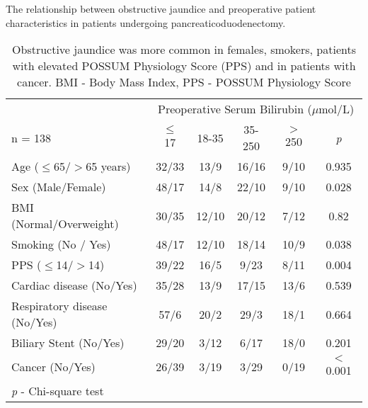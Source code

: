 \begin{table}[p]
\caption{The relationship  between obstructive jaundice and preoperative patient characteristics in patients undergoing pancreaticoduodenectomy.}
\label{table:cpet_oj_patient}
\centering\renewcommand{\arraystretch}{1.4} %
\setlength{\tabcolsep}{10pt} %
	\begin{tabular}{| l | c c c c c |}
		\hline
		                             & \multicolumn{5}{c|}{Preoperative Serum Bilirubin ($\mu$mol/L)} \\
		n = 138                      & $\leq$ 17 & 18-35 & 35-250 & $>$ 250 & \textit{p}              \\ \hline
		Age ($\leq$65/$>$65 years)   & 32/33     & 13/9  & 16/16  & 9/10    & 0.935                   \\
		Sex (Male/Female)            & 48/17     & 14/8  & 22/10  & 9/10    & 0.028                   \\
		BMI (Normal/Overweight)      & 30/35     & 12/10 & 20/12  & 7/12    & 0.82                    \\
		Smoking (No / Yes)           & 48/17     & 12/10 & 18/14  & 10/9    & 0.038                   \\
		PPS ($\leq$14/$>$14)         & 39/22     & 16/5  & 9/23   & 8/11    & 0.004                   \\
		Cardiac disease (No/Yes)     & 35/28     & 13/9  & 17/15  & 13/6    & 0.539                   \\
		Respiratory disease (No/Yes) & 57/6      & 20/2  & 29/3   & 18/1    & 0.664                   \\
		Biliary Stent (No/Yes)       & 29/20     & 3/12  & 6/17   & 18/0    & 0.201                   \\
		Cancer (No/Yes)              & 26/39     & 3/19  & 3/29   & 0/19    & $<$0.001                \\ \hline
		\multicolumn{6}{l}{\textit{p} - Chi-square test}
	\end{tabular}
	\medskip
	\caption*{Obstructive jaundice was more common in females, smokers, patients with elevated POSSUM Physiology Score (PPS) and in patients with cancer. BMI - Body Mass Index, PPS - POSSUM Physiology Score}
\end{table}